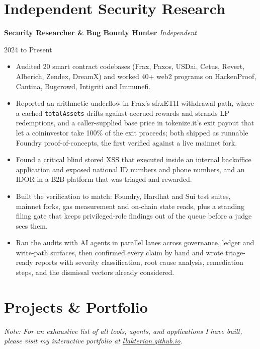 \documentclass[10pt,a4paper]{article}
\newcommand{\role}[3]{%
  \par\vspace{0.55em}%
  {\sffamily\bfseries #1} \hfill {\small\itshape #2}%
  \par {\small #3}\par%
  \vspace{0.15em}%
}
\begin{document}
\section{Independent Security Research}

\role{Security Researcher \& Bug Bounty Hunter}{Independent}{2024 to Present}

\begin{itemize}[leftmargin=1.2em]
  \item Audited 20 smart contract codebases (Frax, Paxos, USDai, Cetus, Revert, Alberich, Zendex, DreamX) and worked 40+ web2 programs on HackenProof, Cantina, Bugcrowd, Intigriti and Immunefi.
  \item Reported an arithmetic underflow in Frax's sfrxETH withdrawal path, where a cached \texttt{totalAssets} drifts against accrued rewards and strands LP redemptions, and a caller-supplied base price in tokenize.it's exit payout that let a coininvestor take 100\% of the exit proceeds; both shipped as runnable Foundry proof-of-concepts, the first verified against a live mainnet fork.
  \item Found a critical blind stored XSS that executed inside an internal backoffice application and exposed national ID numbers and phone numbers, and an IDOR in a B2B platform that was triaged and rewarded.
  \item Built the verification to match: Foundry, Hardhat and Sui test suites, mainnet forks, gas measurement and on-chain state reads, plus a standing filing gate that keeps privileged-role findings out of the queue before a judge sees them.
  \item Ran the audits with AI agents in parallel lanes across governance, ledger and write-path surfaces, then confirmed every claim by hand and wrote triage-ready reports with severity classification, root cause analysis, remediation steps, and the dismissal vectors already considered.
\end{itemize}

\section{Projects \& Portfolio}
\vspace{0.3em}
{\small\itshape Note: For an exhaustive list of all tools, agents, and applications I have built, please visit my interactive portfolio at \href{https://llakterian.github.io}{llakterian.github.io}.}\par
\vspace{0.5em}
\end{document}
